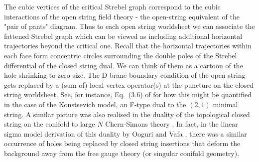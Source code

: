 \documentclass[english]{article}
\begin{document}
The cubic vertices of the critical Strebel graph correspond to the cubic interactions of the open string field theory \cite{WittenOSFT} - the open-string equivalent of the "pair of pants" diagram.  
Thus to each open string worldsheet we can associate the fattened Strebel graph which can be viewed as including additional horizontal trajectories beyond the critical one. Recall that the horizontal trajectories within each face form concentric circles surrounding the double poles of the Strebel differential of the closed string dual. We can think of them as a cartoon of the hole shrinking to zero size. The D-brane boundary condition of the open string gets replaced by a (sum of) local vertex operator(s) at the puncture on the closed string worldsheet. See, for instance, Eq.~(3.6) of \cite{Gaiotto:2003yb} for how this might be quantified in the case of the Konstsevich model, an F-type dual to the $(2,1)$ minimal string. A similar picture was also realised in the duality of the topological closed string on the conifold to large $N$ Chern-Simons theory \cite{GV99}. In fact, in the linear sigma model derivation of this duality by Ooguri and Vafa \cite{OV2002worldsheet}, there was a similar occurrence of holes being replaced by closed string insertions that deform the background away from the free gauge theory (or singular conifold geometry).    



\end{document}

